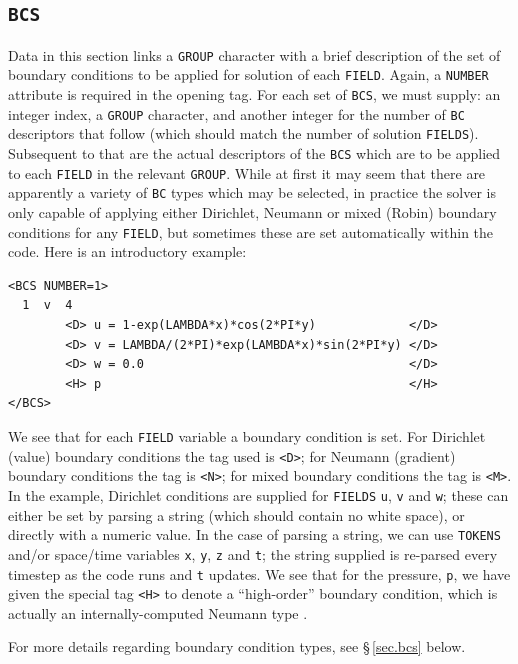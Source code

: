 \documentclass[11pt]{report}
\begin{document}
\subsection{\texttt{BCS}}
\label{sec.bcss}

Data in this section links a \verb|GROUP| character with a brief
description of the set of boundary conditions to be applied for
solution of each \verb|FIELD|.  Again, a \verb|NUMBER| attribute is
required in the opening tag.  For each set of \verb|BCS|, we must
supply: an integer index, a \verb|GROUP| character, and another
integer for the number of \verb|BC| descriptors that follow (which
should match the number of solution \verb|FIELDS|).  Subsequent to
that are the actual descriptors of the \verb|BCS| which are to be
applied to each \verb|FIELD| in the relevant \verb|GROUP|.  While at
first it may seem that there are apparently a variety of \verb|BC|
types which may be selected, in practice the solver is only capable of
applying either Dirichlet, Neumann or mixed (Robin) boundary
conditions for any \verb|FIELD|, but sometimes these are set
automatically within the code.  Here is an introductory example:
%
{\small
\begin{verbatim}
<BCS NUMBER=1>
  1  v  4
        <D> u = 1-exp(LAMBDA*x)*cos(2*PI*y)             </D>
        <D> v = LAMBDA/(2*PI)*exp(LAMBDA*x)*sin(2*PI*y) </D>
        <D> w = 0.0                                     </D>
        <H> p                                           </H>
</BCS>
\end{verbatim}
}
%
We see that for each \verb|FIELD| variable a boundary condition is
set.  For Dirichlet (value) boundary conditions the tag used is
\verb|<D>|; for Neumann (gradient) boundary conditions the tag is
\verb|<N>|; for mixed boundary conditions the tag is \verb|<M>|.  In
the example, Dirichlet conditions are supplied for \verb|FIELDS|
\verb|u|, \verb|v| and \verb|w|; these can either be set by parsing a
string (which should contain no white space), or directly with a
numeric value.  In the case of parsing a string, we can use
\verb|TOKENS| and/or space/time variables \verb|x|, \verb|y|, \verb|z|
and \verb|t|; the string supplied is re-parsed every timestep as the
code runs and \verb|t| updates.  We see that for the pressure,
\verb|p|, we have given the special tag \verb|<H>| to denote a
``high-order'' boundary condition, which is actually an
internally-computed Neumann type \citep[see][]{kio91}.

For more details regarding boundary condition types, see
\S\,\ref{sec.bcs} below.
\end{document}
